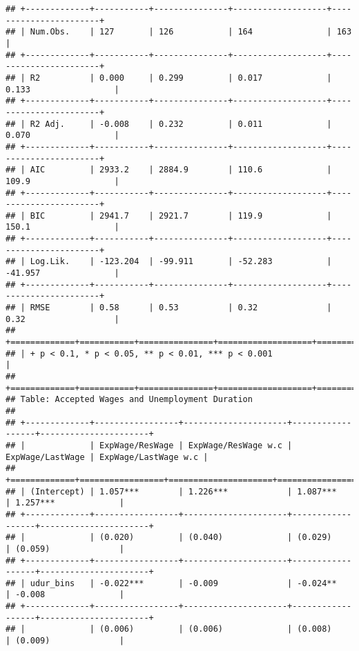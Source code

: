 \begin{verbatim}
## +-------------+-----------+---------------+-------------------+-----------------------+
## | Num.Obs.    | 127       | 126           | 164               | 163                   |
## +-------------+-----------+---------------+-------------------+-----------------------+
## | R2          | 0.000     | 0.299         | 0.017             | 0.133                 |
## +-------------+-----------+---------------+-------------------+-----------------------+
## | R2 Adj.     | -0.008    | 0.232         | 0.011             | 0.070                 |
## +-------------+-----------+---------------+-------------------+-----------------------+
## | AIC         | 2933.2    | 2884.9        | 110.6             | 109.9                 |
## +-------------+-----------+---------------+-------------------+-----------------------+
## | BIC         | 2941.7    | 2921.7        | 119.9             | 150.1                 |
## +-------------+-----------+---------------+-------------------+-----------------------+
## | Log.Lik.    | -123.204  | -99.911       | -52.283           | -41.957               |
## +-------------+-----------+---------------+-------------------+-----------------------+
## | RMSE        | 0.58      | 0.53          | 0.32              | 0.32                  |
## +=============+===========+===============+===================+=======================+
## | + p < 0.1, * p < 0.05, ** p < 0.01, *** p < 0.001                                   |
## +=============+===========+===============+===================+=======================+
## Table: Accepted Wages and Unemployment Duration 
## 
## +-------------+-----------------+---------------------+------------------+----------------------+
## |             | ExpWage/ResWage | ExpWage/ResWage w.c | ExpWage/LastWage | ExpWage/LastWage w.c |
## +=============+=================+=====================+==================+======================+
## | (Intercept) | 1.057***        | 1.226***            | 1.087***         | 1.257***             |
## +-------------+-----------------+---------------------+------------------+----------------------+
## |             | (0.020)         | (0.040)             | (0.029)          | (0.059)              |
## +-------------+-----------------+---------------------+------------------+----------------------+
## | udur_bins   | -0.022***       | -0.009              | -0.024**         | -0.008               |
## +-------------+-----------------+---------------------+------------------+----------------------+
## |             | (0.006)         | (0.006)             | (0.008)          | (0.009)              |

\end{verbatim}
